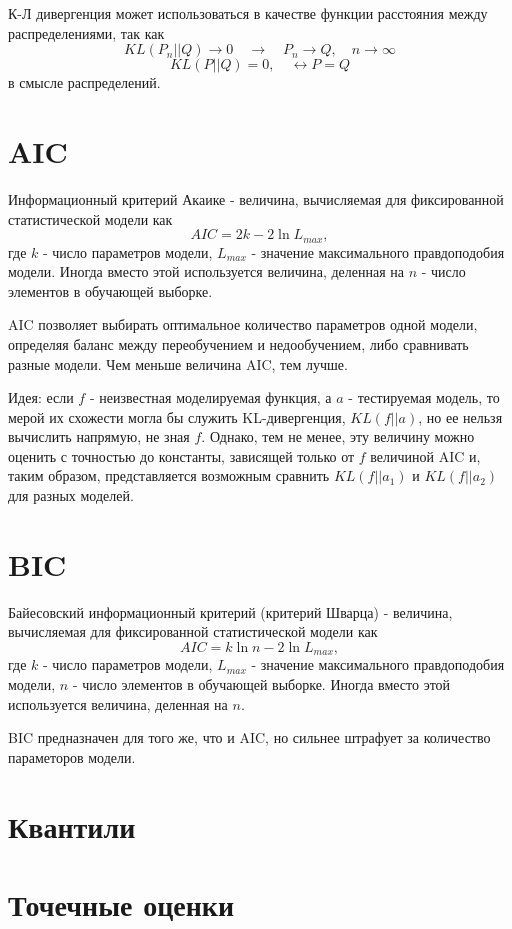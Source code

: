 К-Л дивергенция может использоваться в качестве функции расстояния между распределениями, так как
$$
KL(P_n||Q) \rightarrow 0 \quad \rightarrow \quad P_n \rightarrow Q, \quad n \rightarrow \infty
$$
$$
KL(P||Q)=0, \quad \leftrightarrow P = Q
$$
в смысле распределений.


\section{AIC}

Информационный критерий Акаике - величина, вычисляемая для фиксированной статистической модели как
$$
AIC = 2k - 2\ln L_{max},
$$
где $k$ - число параметров модели, $L_{max}$ - значение максимального правдоподобия модели. Иногда вместо этой используется величина, деленная на $n$ - число элементов в обучающей выборке.

AIC позволяет выбирать оптимальное количество параметров одной модели, определяя баланс между переобучением и недообучением, либо сравнивать разные модели. Чем меньше величина AIC, тем лучше.

Идея: если $f$ - неизвестная моделируемая функция, а $a$ - тестируемая модель, то мерой их схожести могла бы служить KL-дивергенция, $KL(f||a)$, но ее нельзя вычислить напрямую, не зная $f$. Однако, тем не менее, эту величину можно оценить с точностью до константы, зависящей только от $f$ величиной AIC и, таким образом, представляется возможным сравнить $KL(f||a_1)$ и $KL(f||a_2)$ для разных моделей.


\section{BIC}

Байесовский информационный критерий (критерий Шварца) - величина, вычисляемая для фиксированной статистической модели как
$$
AIC = k\ln n - 2\ln L_{max},
$$
где $k$ - число параметров модели, $L_{max}$ - значение максимального правдоподобия модели, $n$ - число элементов в обучающей выборке. Иногда вместо этой используется величина, деленная на $n$.

BIC предназначен для того же, что и AIC, но сильнее штрафует за количество параметоров модели.


\section{Квантили}


\section{Точечные оценки}


